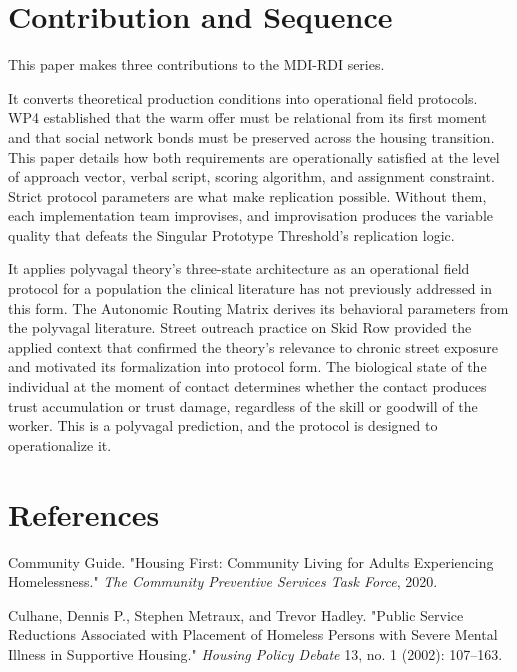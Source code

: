 \documentclass[12pt, letterpaper]{article}
\begin{document}
\clearpage

\clearpage
\section{Contribution and Sequence}

This paper makes three contributions to the MDI-RDI series.

It converts theoretical production conditions into operational field protocols. WP4 established that the warm offer must be relational from its first moment and that social network bonds must be preserved across the housing transition. This paper details how both requirements are operationally satisfied at the level of approach vector, verbal script, scoring algorithm, and assignment constraint. Strict protocol parameters are what make replication possible. Without them, each implementation team improvises, and improvisation produces the variable quality that defeats the Singular Prototype Threshold's replication logic.

It applies polyvagal theory's three-state architecture as an operational field protocol for a population the clinical literature has not previously addressed in this form. The Autonomic Routing Matrix derives its behavioral parameters from the polyvagal literature. Street outreach practice on Skid Row provided the applied context that confirmed the theory's relevance to chronic street exposure and motivated its formalization into protocol form. The biological state of the individual at the moment of contact determines whether the contact produces trust accumulation or trust damage, regardless of the skill or goodwill of the worker. This is a polyvagal prediction, and the protocol is designed to operationalize it.




\newpage


\clearpage
{}
\section*{References}

Community Guide. "Housing First: Community Living for Adults Experiencing Homelessness." \textit{The Community Preventive Services Task Force}, 2020.

Culhane, Dennis P., Stephen Metraux, and Trevor Hadley. "Public Service Reductions Associated with Placement of Homeless Persons with Severe Mental Illness in Supportive Housing." \textit{Housing Policy Debate} 13, no. 1 (2002): 107–163.
\end{document}
